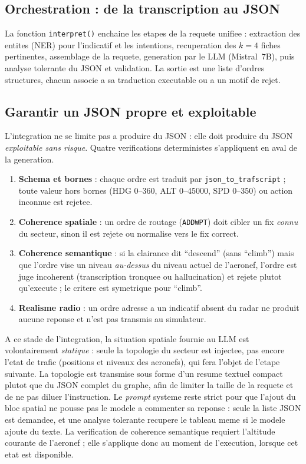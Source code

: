 \documentclass[11pt,a4paper]{article}
\begin{document}
\subsection{Orchestration : de la transcription au JSON}

La fonction \texttt{interpret()} enchaine les etapes de la requete unifiee : extraction
des entites (NER) pour l'indicatif et les intentions, recuperation des $k = 4$ fiches
pertinentes, assemblage de la requete, generation par le LLM (Mistral~7B), puis analyse
tolerante du JSON et validation. La sortie est une liste d'ordres structures, chacun
associe a sa traduction executable ou a un motif de rejet.

\subsection{Garantir un JSON propre et exploitable}

L'integration ne se limite pas a produire du JSON : elle doit produire du JSON
\emph{exploitable sans risque}. Quatre verifications deterministes s'appliquent en aval
de la generation.

\begin{enumerate}[label=\textbf{\arabic*.}, leftmargin=2.0em]
  \item \textbf{Schema et bornes} : chaque ordre est traduit par
  \texttt{json\_to\_trafscript} ; toute valeur hors bornes (HDG 0--360, ALT 0--45000,
  SPD 0--350) ou action inconnue est rejetee.
  \item \textbf{Coherence spatiale} : un ordre de routage (\texttt{ADDWPT}) doit cibler
  un fix \emph{connu} du secteur, sinon il est rejete ou normalise vers le fix correct.
  \item \textbf{Coherence semantique} : si la clairance dit ``descend'' (sans
  ``climb'') mais que l'ordre vise un niveau \emph{au-dessus} du niveau actuel de
  l'aeronef, l'ordre est juge incoherent (transcription tronquee ou hallucination) et
  rejete plutot qu'execute ; le critere est symetrique pour ``climb''.
  \item \textbf{Realisme radio} : un ordre adresse a un indicatif absent du radar ne
  produit aucune reponse et n'est pas transmis au simulateur.
\end{enumerate}

\begin{warnbox}
A ce stade de l'integration, la situation spatiale fournie au LLM est volontairement
\emph{statique} : seule la topologie du secteur est injectee, pas encore l'etat de
trafic (positions et niveaux des aeronefs), qui fera l'objet de l'etape suivante. La
topologie est transmise sous forme d'un resume textuel compact plutot que du JSON
complet du graphe, afin de limiter la taille de la requete et de ne pas diluer
l'instruction. Le \emph{prompt} systeme reste strict pour que l'ajout du bloc spatial
ne pousse pas le modele a commenter sa reponse : seule la liste JSON est demandee, et
une analyse tolerante recupere le tableau meme si le modele ajoute du texte. La
verification de coherence semantique requiert l'altitude courante de l'aeronef ; elle
s'applique donc au moment de l'execution, lorsque cet etat est disponible.
\end{warnbox}
\end{document}
